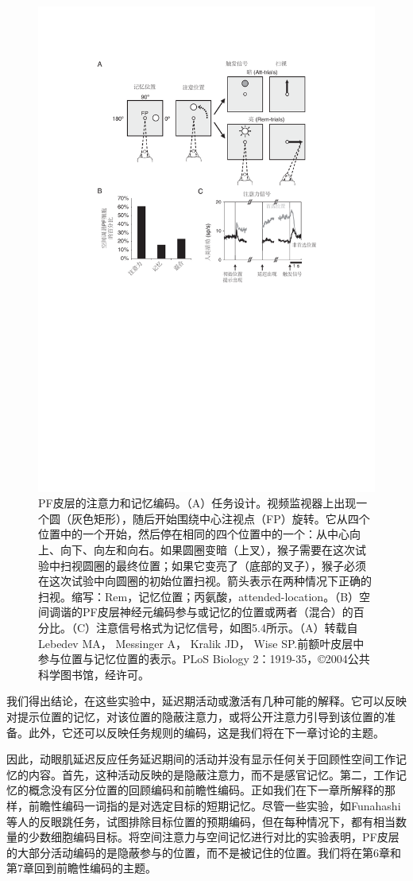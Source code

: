 \begin{figure}
	\centering
	\includegraphics[width=0.7\linewidth]{image_pfc/Fig_5_6}
	\caption{PF皮层的注意力和记忆编码。（A）任务设计。视频监视器上出现一个圆（灰色矩形），随后开始围绕中心注视点（FP）旋转。它从四个位置中的一个开始，然后停在相同的四个位置中的一个：从中心向上、向下、向左和向右。如果圆圈变暗（上叉），猴子需要在这次试验中扫视圆圈的最终位置；如果它变亮了（底部的叉子），猴子必须在这次试验中向圆圈的初始位置扫视。箭头表示在两种情况下正确的扫视。缩写：Rem，记忆位置；丙氨酸，attended-location。（B）空间调谐的PF皮层神经元编码参与或记忆的位置或两者（混合）的百分比。（C）注意信号格式为记忆信号，如图5.4所示。（A）转载自Lebedev MA， Messinger A， Kralik JD， Wise SP.前额叶皮层中参与位置与记忆位置的表示。PLoS Biology 2：1919-35，©2004公共科学图书馆，经许可。}
	\label{fig:fig}
\end{figure}

我们得出结论，在这些实验中，延迟期活动或激活有几种可能的解释。它可以反映对提示位置的记忆，对该位置的隐蔽注意力，或将公开注意力引导到该位置的准备。此外，它还可以反映任务规则的编码，这是我们将在下一章讨论的主题。

因此，动眼肌延迟反应任务延迟期间的活动并没有显示任何关于回顾性空间工作记忆的内容。首先，这种活动反映的是隐蔽注意力，而不是感官记忆。第二，工作记忆的概念没有区分位置的回顾编码和前瞻性编码。正如我们在下一章所解释的那样，前瞻性编码一词指的是对选定目标的短期记忆。尽管一些实验，如Funahashi等人的反眼跳任务，试图排除目标位置的预期编码，但在每种情况下，都有相当数量的少数细胞编码目标。将空间注意力与空间记忆进行对比的实验表明，PF皮层的大部分活动编码的是隐蔽参与的位置，而不是被记住的位置。我们将在第6章和第7章回到前瞻性编码的主题。
